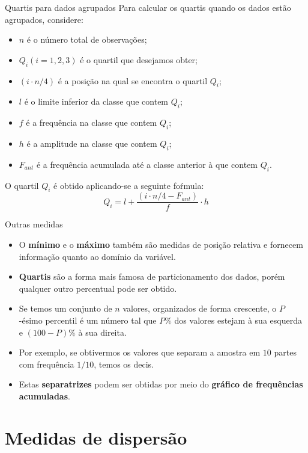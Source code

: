 \documentclass[
  ignorenonframetext,
  serif,
  professionalfont,
  usenames,
  dvipsnames,
  aspectratio = 169]{beamer}
\providecommand{\tightlist}{%
  \setlength{\itemsep}{0pt}\setlength{\parskip}{0pt}}
\renewcommand{\tightlist}{%
  \setlength{\itemsep}{0\baselineskip}
  \setlength{\parskip}{0.25\baselineskip}
}
\begin{document}
\begin{frame}{Quartis para dados agrupados}
\label{quartis-para-dados-agrupados}
Para calcular os quartis quando os dados estão agrupados, considere:

\begin{itemize}
\tightlist
\item
  \(n\) é o número total de observações;
\item
  \(Q_i (i=1,2,3)\) é o quartil que desejamos obter;
\item
  \((i \cdot n/4)\) é a posição na qual se encontra o quartil \(Q_i\);
\item
  \(l\) é o limite inferior da classe que contem \(Q_i\);
\item
  \(f\) é a frequência na classe que contem \(Q_i\);
\item
  \(h\) é a amplitude na classe que contem \(Q_i\);
\item
  \(F_{ant}\) é a frequência acumulada até a classe anterior à que
  contem \(Q_i\).
\end{itemize}

O quartil \(Q_i\) é obtido aplicando-se a seguinte foŕmula:
\[Q_i=l+\frac{(i \cdot n/4-F_{ant})}{f} \cdot h\]
\end{frame}

\begin{frame}{Outras medidas}
\label{outras-medidas}
\begin{itemize}
\item
  O \textbf{mínimo} e o \textbf{máximo} também são medidas de posição
  relativa e fornecem informação quanto ao domínio da variável.
\item
  \textbf{Quartis} são a forma mais famosa de particionamento dos dados,
  porém qualquer outro percentual pode ser obtido.
\item
  Se temos um conjunto de \(n\) valores, organizados de forma crescente,
  o \(P\)-ésimo percentil é um número tal que \(P\%\) dos valores
  estejam à sua esquerda e \((100 - P)\%\) à sua direita.
\item
  Por exemplo, se obtivermos os valores que separam a amostra em \(10\)
  partes com frequência \(1/10\), temos os decis.
\item
  Estas \textbf{separatrizes} podem ser obtidas por meio do
  \textbf{gráfico de frequências acumuladas}.
\end{itemize}
\end{frame}

\section{Medidas de dispersão}\label{medidas-de-dispersuxe3o}
\end{document}
